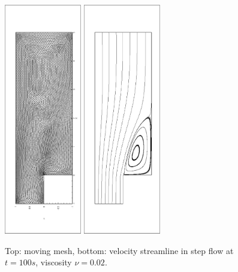       \begin{figure}[!htbp]
        \centering
        \includegraphics[width = 0.3\textwidth, angle =
        -90]{picture/second/L_shaped_flow_data/mesh.eps}
        \includegraphics[width = 0.3\textwidth, angle =
        -90]{picture/second/L_shaped_flow_data/streamline.eps}
        \caption{\small Top: moving mesh, bottom: velocity streamline
          in step flow at $t = 100s$, viscosity $\nu = 0.02$.}
        \label{fig::step_flow_mesh_streamline}
      \end{figure}

